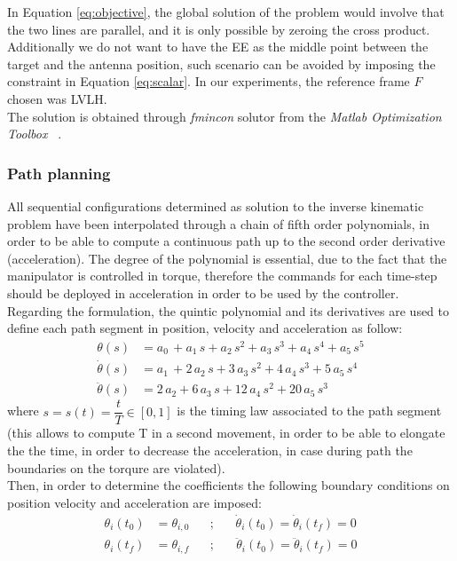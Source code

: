In Equation \ref{eq:objective}, the global solution of the problem would involve that the two lines are parallel, and it is only possible by zeroing the cross product. Additionally we do not want to have the EE as the middle point between the target and the antenna position, such scenario can be avoided by imposing the constraint in Equation \ref{eq:scalar}.
In our experiments, the reference frame $F$ chosen was LVLH.\\
The solution is obtained through \textit{fmincon}{} solutor from the \textit{Matlab Optimization Toolbox} ~.


\subsubsection{Path planning}
All sequential configurations determined as solution to the inverse kinematic problem have been interpolated through a chain of fifth order polynomials, in order to be able to compute a continuous path up to the second order derivative (acceleration). The degree of the polynomial is essential, due to the fact that the manipulator is controlled in torque, therefore the commands for each time-step should be deployed in acceleration in order to be used by the controller. \\

Regarding the formulation, the quintic polynomial and its derivatives are used to define each path segment in position, velocity and acceleration as follow:
\begin{align*}
\theta(s)&=a_0\,+a_1\,s+a_2\,s^2+a_3\,s^3+a_4\,s^4+a_5\,s^5\\
\dot\theta(s)&=a_1\,+2\,a_2\,s+3\,a_3\,s^2+4\,a_4\,s^3+5\,a_5\,s^4\\
\ddot\theta(s)&=2\,a_2+6\,a_3\,s+12\,a_4\,s^2+20\,a_5\,s^3
\end{align*}
where $s=s(t)=\dfrac{t}{T}\in{[0,1]}$ is the timing law associated to the path segment (this allows to compute T in a second movement, in order to be able to elongate the the time, in order to decrease the acceleration, in case 
 during path the boundaries on the torqure are violated). \\
Then, in order to determine the coefficients the following boundary conditions on position velocity and acceleration are imposed:
\begin{align*}
\theta_i(t_0)&=\theta_{i,0} \;\;\;\;\;\; ; \;\;\;\;\;\ \dot{\theta}_i(t_0)=\dot{\theta}_i(t_f)=0 \\
\theta_i(t_f)&=\theta_{i,f}  \;\;\;\;\;\; ; \;\;\;\;\;\; \ddot{\theta}_i(t_0)=\ddot{\theta}_i(t_f)=0 
\end{align*}


